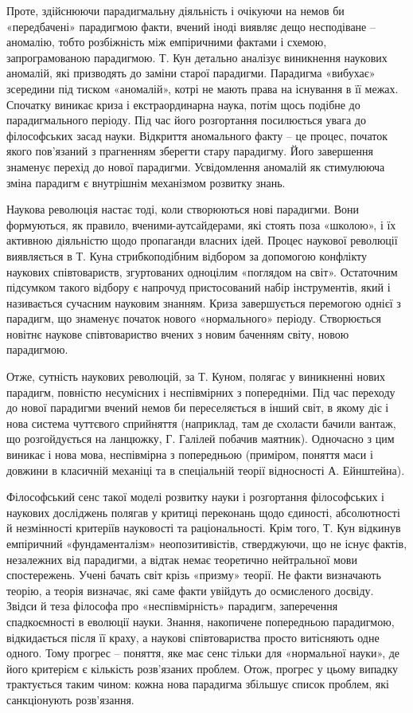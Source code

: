 Проте, здійснюючи парадигмальну діяльність і очікуючи на немов би
«передбачені» парадигмою факти, вчений іноді виявляє дещо несподіване –
аномалію, тобто розбіжність між емпіричними фактами і схемою,
запрограмованою парадигмою. Т. Кун детально аналізує виникнення наукових
аномалій, які призводять до заміни старої парадигми. Парадигма «вибухає»
зсередини під тиском «аномалій», котрі не мають права на існування в її межах.
Спочатку виникає криза і екстраординарна наука, потім щось подібне до
парадигмального періоду. Під час його розгортання посилюється увага до
філософських засад науки. Відкриття аномального факту – це процес, початок
якого пов’язаний з прагненням зберегти стару парадигму. Його завершення
знаменує перехід до нової парадигми. Усвідомлення аномалій як стимулююча
зміна парадигм є внутрішнім механізмом розвитку знань.

Наукова революція настає тоді, коли створюються нові парадигми. Вони
формуються, як правило, вченими-аутсайдерами, які стоять поза «школою», і їх
активною діяльністю щодо пропаганди власних ідей. Процес наукової
революції виявляється в Т. Куна стрибкоподібним відбором за допомогою
конфлікту наукових співтовариств, згуртованих одноцілим «поглядом на світ».
Остаточним підсумком такого відбору є напрочуд пристосований набір
інструментів, який і називається сучасним науковим знанням. Криза
завершується перемогою однієї з парадигм, що знаменує початок нового
«нормального» періоду. Створюється новітнє наукове співтовариство вчених з
новим баченням світу, новою парадигмою.

Отже, сутність наукових революцій, за Т. Куном, полягає у виникненні
нових парадигм, повністю несумісних і неспівмірних з попередніми. Під час
переходу до нової парадигми вчений немов би переселяється в інший світ, в
якому діє і нова система чуттєвого сприйняття (наприклад, там де схоласти
бачили вантаж, що розгойдується на ланцюжку, Г. Галілей побачив маятник).
Одночасно з цим виникає і нова мова, неспівмірна з попередньою (приміром,
поняття маси і довжини в класичній механіці та в спеціальній теорії відносності
А. Ейнштейна).

Філософський сенс такої моделі розвитку науки і розгортання філософських
і наукових досліджень полягав у критиці переконань щодо єдиності,
абсолютності й незмінності критеріїв науковості та раціональності. Крім того,
Т. Кун відкинув емпіричний «фундаменталізм» неопозитивістів, стверджуючи,
що не існує фактів, незалежних від парадигми, а відтак немає теоретично
нейтральної мови спостережень. Учені бачать світ крізь «призму» теорії. Не
факти визначають теорію, а теорія визначає, які саме факти увійдуть до
осмисленого досвіду. Звідси й теза філософа про «неспівмірність» парадигм,
заперечення спадкоємності в еволюції науки. Знання, накопичене попередньою
парадигмою, відкидається після її краху, а наукові співтовариства просто
витісняють одне одного. Тому прогрес – поняття, яке має сенс тільки для
«нормальної науки», де його критерієм є кількість розв’язаних проблем. Отож,
прогрес у цьому випадку трактується таким чином: кожна нова парадигма
збільшує список проблем, які санкціонують розв’язання.

